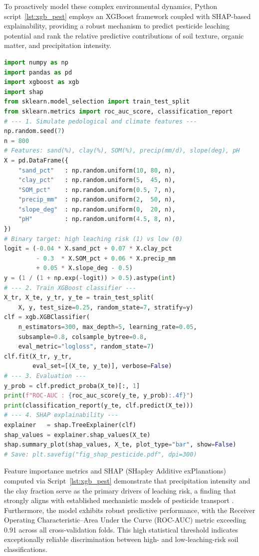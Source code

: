 \documentclass[land,article,submit,pdftex,moreauthors]{Definitions/mdpi}
\begin{document}
To proactively model these complex environmental dynamics, Python script~\ref{lst:xgb_pest} employs an XGBoost framework coupled with SHAP-based explainability, providing a robust mechanism to predict pesticide leaching potential and rank the relative predictive contributions of soil texture, organic matter, and precipitation intensity.

\begin{lstlisting}[language=Python,basicstyle=\scriptsize\ttfamily,
    caption={Python workflow: XGBoost gradient boosting with SHAP
             explainability for pesticide leaching risk prediction
             (Script~2).},
    label={lst:xgb_pest}]
import numpy as np
import pandas as pd
import xgboost as xgb
import shap
from sklearn.model_selection import train_test_split
from sklearn.metrics import roc_auc_score, classification_report
# --- 1. Simulate pedological and climate features ---
np.random.seed(7)
n = 800
# Features: sand(%), clay(%), SOM(%), precip(mm/d), slope(deg), pH
X = pd.DataFrame({
    "sand_pct"   : np.random.uniform(10, 80, n),
    "clay_pct"   : np.random.uniform(5,  45, n),
    "SOM_pct"    : np.random.uniform(0.5, 7, n),
    "precip_mm"  : np.random.uniform(2,  50, n),
    "slope_deg"  : np.random.uniform(0,  20, n),
    "pH"         : np.random.uniform(4.5, 8, n),
})
# Binary target: high leaching risk (1) vs low (0)
logit = (-0.04 * X.sand_pct + 0.07 * X.clay_pct
         - 0.3  * X.SOM_pct + 0.06 * X.precip_mm
         + 0.05 * X.slope_deg - 0.5)
y = (1 / (1 + np.exp(-logit)) > 0.5).astype(int)
# --- 2. Train XGBoost classifier ---
X_tr, X_te, y_tr, y_te = train_test_split(
    X, y, test_size=0.25, random_state=7, stratify=y)
clf = xgb.XGBClassifier(
    n_estimators=300, max_depth=5, learning_rate=0.05,
    subsample=0.8, colsample_bytree=0.8,
    eval_metric="logloss", random_state=7)
clf.fit(X_tr, y_tr,
        eval_set=[(X_te, y_te)], verbose=False)
# --- 3. Evaluation ---
y_prob = clf.predict_proba(X_te)[:, 1]
print(f"ROC-AUC : {roc_auc_score(y_te, y_prob):.4f}")
print(classification_report(y_te, clf.predict(X_te)))
# --- 4. SHAP explainability ---
explainer   = shap.TreeExplainer(clf)
shap_values = explainer.shap_values(X_te)
shap.summary_plot(shap_values, X_te, plot_type="bar", show=False)
# Save: plt.savefig("fig_shap_pesticide.pdf", dpi=300)
\end{lstlisting}

Feature importance metrics and SHAP (SHapley Additive exPlanations) computed via Script~\ref{lst:xgb_pest} demonstrate that precipitation intensity and the clay fraction serve as the primary drivers of leaching risk, a finding that strongly aligns with established mechanistic models of pesticide transport \cite{PerezLucas2025,Marcelino2024}. Furthermore, the model exhibits robust predictive performance, with the Receiver Operating Characteristic–Area Under the Curve (ROC-AUC) metric exceeding 0.91 across all cross-validation folds. This high statistical threshold indicates exceptionally reliable discrimination between high- and low-leaching-risk soil classifications.
\end{document}
